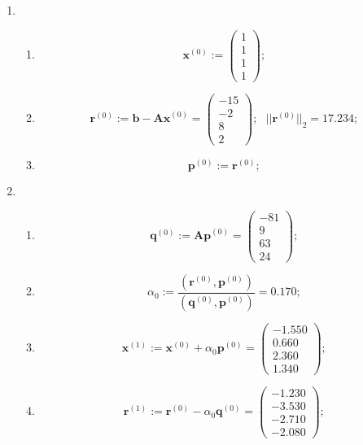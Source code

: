 \begin{enumerate}
    \item \begin{enumerate}
        \item $$\mathbf{x}^{(0)} :=
        \begin{pmatrix} 1\\ 1\\ 1\\ 1 \end{pmatrix};$$

        \item $$\mathbf{r}^{(0)} :=
        \mathbf{b-Ax}^{(0)} = \begin{pmatrix} -15\\ -2\\ 8 \\ 2 \end{pmatrix}; ~~~
        ||\mathbf{r}^{(0)}||_2 = \mathbf{17.234};$$

        \item $$\mathbf{p}^{(0)} := \mathbf{r}^{(0)};$$
    \end{enumerate}

    \item \begin{enumerate}
        \item $$\mathbf{q}^{(0)} :=
        \mathbf{Ap}^{(0)} = \begin{pmatrix} -81\\ 9\\ 63\\ 24 \end{pmatrix};$$

        \item $$\alpha_0 :=
        \dfrac{(\mathbf{r}^{(0)}, \mathbf{p}^{(0)})}{(\mathbf{q}^{(0)}, \mathbf{p}^{(0)})} = 0.170;$$

        \item $$\mathbf{x}^{(1)} :=
        \mathbf{x}^{(0)}+\alpha_0\mathbf{p}^{(0)} = \begin{pmatrix} -1.550\\ 0.660\\ 2.360\\ 1.340 \end{pmatrix};$$

        \item $$\mathbf{r}^{(1)} :=
        \mathbf{r}^{(0)}-\alpha_0\mathbf{q}^{(0)} = \begin{pmatrix} -1.230\\ -3.530\\ -2.710 \\ -2.080 \end{pmatrix};$$


\end{enumerate}
\end{enumerate}
